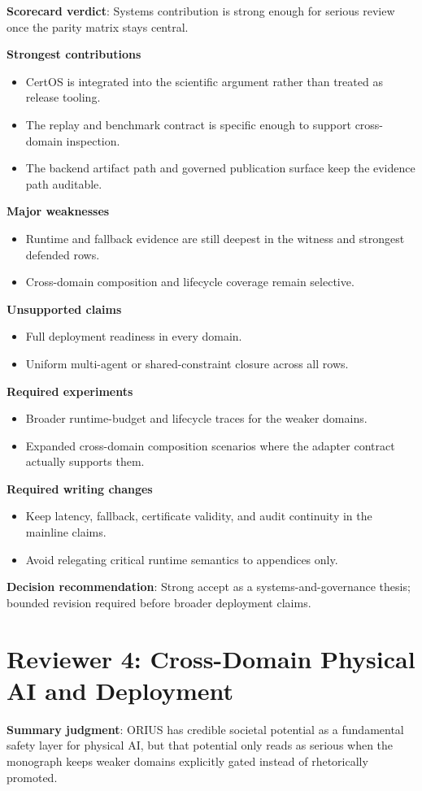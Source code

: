 \textbf{Scorecard verdict}: Systems contribution is strong enough for serious review once the parity matrix stays central.

\textbf{Strongest contributions}
\begin{itemize}
\item CertOS is integrated into the scientific argument rather than treated as release tooling.
\item The replay and benchmark contract is specific enough to support cross-domain inspection.
\item The backend artifact path and governed publication surface keep the evidence path auditable.
\end{itemize}
\textbf{Major weaknesses}
\begin{itemize}
\item Runtime and fallback evidence are still deepest in the witness and strongest defended rows.
\item Cross-domain composition and lifecycle coverage remain selective.
\end{itemize}
\textbf{Unsupported claims}
\begin{itemize}
\item Full deployment readiness in every domain.
\item Uniform multi-agent or shared-constraint closure across all rows.
\end{itemize}
\textbf{Required experiments}
\begin{itemize}
\item Broader runtime-budget and lifecycle traces for the weaker domains.
\item Expanded cross-domain composition scenarios where the adapter contract actually supports them.
\end{itemize}
\textbf{Required writing changes}
\begin{itemize}
\item Keep latency, fallback, certificate validity, and audit continuity in the mainline claims.
\item Avoid relegating critical runtime semantics to appendices only.
\end{itemize}
\textbf{Decision recommendation}: Strong accept as a systems-and-governance thesis; bounded revision required before broader deployment claims.

\section{Reviewer 4: Cross-Domain Physical AI and Deployment}
\textbf{Summary judgment}: ORIUS has credible societal potential as a fundamental safety layer for physical AI, but that potential only reads as serious when the monograph keeps weaker domains explicitly gated instead of rhetorically promoted.

